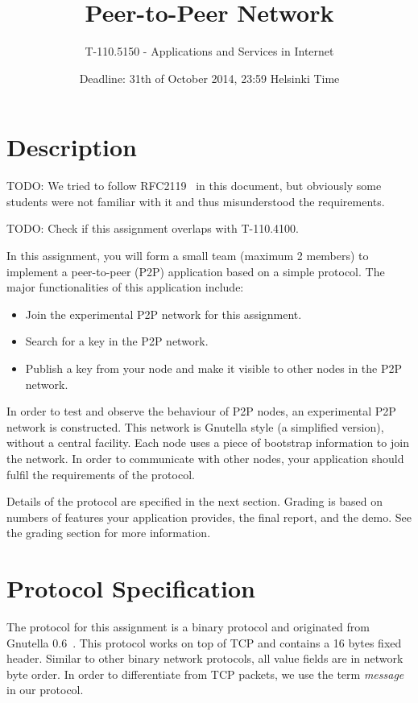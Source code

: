 \documentclass[12pt, a4paper]{article}
\title{Peer-to-Peer Network}
\author{T-110.5150 - Applications and Services in Internet}
\date{Deadline: 31th of October 2014, 23:59 Helsinki Time}
\newcommand{\TODO}[1]{\noindent\colorbox{aaltoYellow}{\color{black} TODO: #1}}
\begin{document}
\maketitle
\section{Description}

\TODO{} We tried to follow RFC2119~\cite{rfc2119} in this document, but obviously some students were not familiar with it and thus misunderstood the requirements.

\TODO{} Check if this assignment overlaps with T-110.4100.

In this assignment, you will form a small team (maximum 2 members) to implement a peer-to-peer (P2P) application based on a simple protocol.
The major functionalities of this application include:

\begin{itemize}
\item Join the experimental P2P network for this assignment.
\item Search for a key in the P2P network.
\item Publish a key from your node and make it visible to other nodes in the P2P network.
\end{itemize}

In order to test and observe the behaviour of P2P nodes, an experimental P2P network is constructed.
This network is Gnutella style (a simplified version), without a central facility.
Each node uses a piece of bootstrap information to join the network.
In order to communicate with other nodes, your application should fulfil the requirements of the protocol.

Details of the protocol are specified in the next section.
Grading is based on numbers of features your application provides, the final report, and the demo.
See the grading section for more information.


\section{Protocol Specification}
The protocol for this assignment is a binary protocol and originated from Gnutella 0.6~\cite{gnutella}.
This protocol works on top of TCP and contains a 16 bytes fixed header.
Similar to other binary network protocols, all value fields are in network byte order.
In order to differentiate from TCP packets, we use the term \emph{message} in our protocol.
\end{document}
